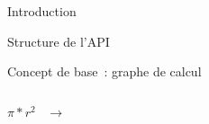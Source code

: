 \begin{frame}{Introduction}
\end{frame}

\begin{frame}{Structure de l'API}
\end{frame}

\begin{frame}{Concept de base~: graphe de calcul}
  \begin{minipage}[l]{0.15\linewidth}
      $\;$
  \end{minipage}\hfill
  \begin{minipage}[l]{0.35\linewidth}
    \huge
    \begin{center}
      $\pi*r^2\;\;\;\rightarrow$
    \end{center}
  \end{minipage}\hfill
  \begin{minipage}[l]{0.49\linewidth}
  \end{minipage}\hfill
\end{frame}
